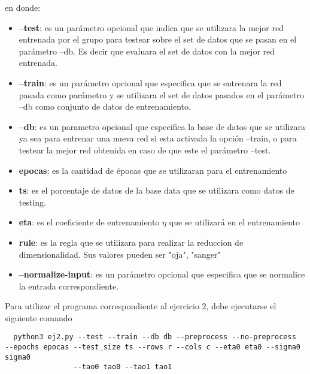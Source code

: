 en donde:
\begin{itemize}
  \item \textbf{--test}: es un parámetro opcional que indica que se utilizara la mejor red entrenada por el grupo para testear sobre el set de datos que se pasan en el parámetro
  --db. Es decir que evaluara el set de datos con la mejor red entrenada.
  \item \textbf{--train}: es un parámetro opcional que especifica que se entrenara la red pasada como parámetro y se utilizara el set de datos pasados en el parámetro --db
  como conjunto de datos de entrenamiento.
  \item \textbf{--db}: es un parametro opcional que especifica la base de datos que se utilizara ya sea para entrenar una nueva red si esta activada la opción --train, o
  para testear la mejor red obtenida en caso de que este el parámetro --test.
  \item \textbf{epocas}: es la cantidad de épocas que se utilizaran para el entrenamiento
  \item \textbf{ts}: es el porcentaje de datos de la base data que se utilizara como datos de testing.
  \item \textbf{eta}: es el coeficiente de entrenamiento $\eta$ que se utilizará en el entrenamiento
  \item \textbf{rule}: es la regla que se utilizara para realizar la reduccion de dimensionalidad. Sus valores pueden ser {"oja", "sanger"}
  \item \textbf{--normalize-input}: es un parámetro opcional que especifica que se normalice la entrada correspondiente.
\end{itemize}

Para utilizar el programa correspondiente al ejercicio 2, debe ejecutarse el siguiente comando
\begin{verbatim}
  python3 ej2.py --test --train --db db --preprocess --no-preprocess  --epochs epocas --test_size ts --rows r --cols c --eta0 eta0 --sigma0 sigma0
                --tao0 tao0 --tao1 tao1
\end{verbatim}

